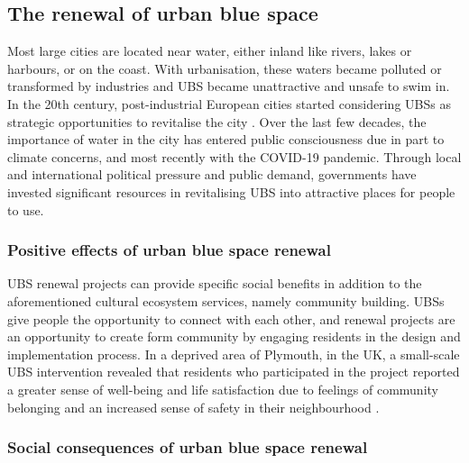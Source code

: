 \documentclass{article}
\begin{document}
\subsection{The renewal of urban blue space}

Most large cities are located near water, either inland like rivers, lakes or harbours, or on the coast. With urbanisation, these waters became polluted or transformed by industries \parencite{kampa_langaas_anzaldua_2016} and UBS became unattractive and unsafe to swim in.
In the 20th century, post-industrial European cities started considering UBSs as strategic opportunities to revitalise the city \parencite{del2021dismantling}. Over the last few decades, the importance of water in the city has entered public consciousness due in part to climate concerns, and most recently with the COVID-19 pandemic.
Through local and international political pressure and public demand, governments have invested significant resources in revitalising UBS into attractive places for people to use.

\subsubsection{Positive effects of urban blue space renewal}

UBS renewal projects can provide specific social benefits in addition to the aforementioned cultural ecosystem services, namely community building.
UBSs give people the opportunity to connect with each other, and renewal projects are an opportunity to create form community by engaging residents in the design and implementation process. In a deprived area of Plymouth, in the UK, a small-scale UBS intervention revealed that residents who participated in the project reported a greater sense of well-being and life satisfaction due to feelings of community belonging and an increased sense of safety in their neighbourhood \parencite{van2021urban}.



\subsubsection{Social consequences of urban blue space renewal}
\end{document}
